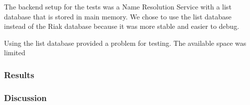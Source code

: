 The backend setup for the tests was a Name Resolution Service with a list database that is stored in main memory. We chose to use the list database instead of the Riak database because it was more stable and easier to debug. 

Using the list database provided a problem for testing. The available space was limited 
\subsubsection{Results}

\subsubsection{Discussion}
